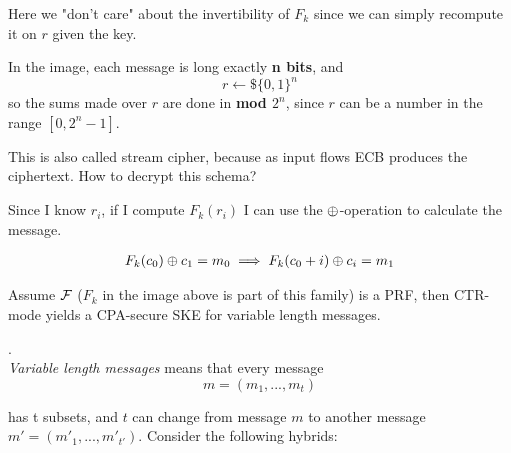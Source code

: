 Here we "don't care" about the invertibility of $F_k$ since we can simply recompute it on $r$ given the key.

In the image, each message is long exactly \textbf{n bits}, and 
\begin{equation*}
    r \leftarrow\$ \{0,1\}^{n}
\end{equation*}
so the sums made over $r$ are done in \textbf{mod $2^{n}$}, since $r$ can be a
number in the range $[0, 2^{n} -1]$.

This is also called stream cipher, because as input flows ECB produces the ciphertext. How to decrypt this schema?

Since I know $r_{i}$, if I compute $F_{k}(r_{i})$ I can use the $\oplus$-operation to calculate the message.

\begin{gather*}
    F_k(c_0)\oplus c_1=m_0 \implies F_k(c_0+i)\oplus c_i = m_1
\end{gather*}

\begin{theorem}
    Assume $\mathcal{F}$ ($F_{k}$ in the image above is part of this family) is a PRF,
    then CTR-mode yields a CPA-secure SKE for variable length messages.
\end{theorem}.\\

\textit{Variable length messages}  means that  every message 
\[
    m=(m_{1}, ..., m_{t})
\]

has t subsets, and $t$ can change from message $m$ to another message
$m'=(m'_{1}, ..., m'_{t'})$.
Consider the following hybrids:

